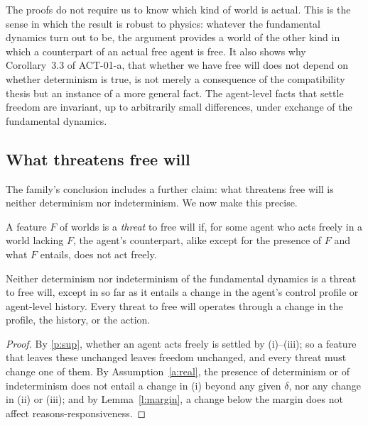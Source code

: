 \documentclass{situationist-preprint}
\begin{document}
The proofs do not require us to know which kind of world is actual. This is the sense in which the result is robust to physics: whatever the fundamental dynamics turn out to be, the argument provides a world of the other kind in which a counterpart of an actual free agent is free. It also shows why Corollary~3.3 of ACT-01-a, that whether we have free will does not depend on whether determinism is true, is not merely a consequence of the compatibility thesis but an instance of a more general fact. The agent-level facts that settle freedom are invariant, up to arbitrarily small differences, under exchange of the fundamental dynamics.

\subsection{What threatens free will}

The family's conclusion includes a further claim: what threatens free will is neither determinism nor indeterminism. We now make this precise.

\begin{definition}[Threat]\label{d:threat}
A feature $F$ of worlds is a \emph{threat} to free will if, for some agent who acts freely in a world lacking $F$, the agent's counterpart, alike except for the presence of $F$ and what $F$ entails, does not act freely.
\end{definition}

\begin{proposition}\label{p:neither}
Neither determinism nor indeterminism of the fundamental dynamics is a threat to free will, except in so far as it entails a change in the agent's control profile or agent-level history. Every threat to free will operates through a change in the profile, the history, or the action.
\end{proposition}

\begin{proof}
By \ref{p:sup}, whether an agent acts freely is settled by (i)--(iii); so a feature that leaves these unchanged leaves freedom unchanged, and every threat must change one of them. By Assumption~\ref{a:real}, the presence of determinism or of indeterminism does not entail a change in (i) beyond any given $\delta$, nor any change in (ii) or (iii); and by Lemma~\ref{l:margin}, a change below the margin does not affect reasons-responsiveness.
\end{proof}
\end{document}
